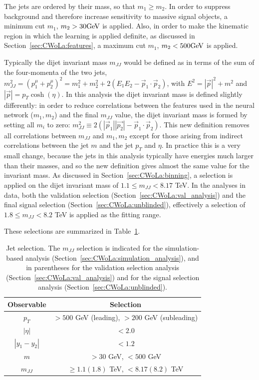 The jets are ordered by their mass, so that $m_1 \ge m_2$.
In order to suppress background and therefore increase sensitivity to massive signal objects, a minimum cut $m_1$, $m_2 > 30 \mathrm{GeV}$ is applied.
Also, in order to make the kinematic region in which the learning is applied definite, as discussed in Section~\ref{sec:CWoLa:features}, a maximum cut $m_1$, $m_2 < 500 \mathrm{GeV}$ is applied.

Typically the dijet invariant mass $m_{JJ}$ would be defined as in terms of the sum of the four-momenta of the two jets, $m_{JJ}^2 = (p^\mu_1+p^\mu_2)^2 = m_1^2+m_2^2+2\left(E_1E_2-\vec{p}_1\cdot\vec{p}_2\right)$, with $E^2 = |\vec{p}|^2+m^2$ and $|\vec{p}| = p_T\cosh(\eta)$.
In this analysis the dijet invariant mass is defined slightly differently: in order to reduce correlations between the features used in the neural network ($m_1,m_2$) and the final $m_{JJ}$ value, the dijet invariant mass is formed by setting all $m_i$ to zero: $m_{JJ}^2 \equiv 2\left(|\vec{p}_1||\vec{p_2}|-\vec{p}_1\cdot\vec{p}_2\right)$.
This new definition removes all correlations between $m_{JJ}$ and $m_1,m_2$ except for those arising from indirect correlations between the jet $m$ and the jet $p_T$ and $\eta$.
In practice this is a very small change, because the jets in this analysis typically have energies much larger than their masses, and so the new definition gives almost the same value for the invariant mass.
As discussed in Section~\ref{sec:CWoLa:binning}, a selection is applied on the dijet invariant mass of $1.1 \le m_{JJ} < 8.17$ TeV.
In the analyses in data, both the validation selection (Section~\ref{sec:CWoLa:val_analysis}) and the final signal selection (Section~\ref{sec:CWoLa:unblinded}), effectively a selection of $1.8 \le m_{JJ} < 8.2$ TeV is applied as the fitting range.

These selections are summarized in Table~\ref{tab:event_selection}.
\begin{table}[htbp]
  \begin{center}
    \caption{Jet selection. The $m_{JJ}$ selection is indicated for the simulation-based analysis (Section~\ref{sec:CWoLa:simulation_analysis}), and in parentheses for the validation selection analysis (Section~\ref{sec:CWoLa:val_analysis}) and for the signal selection analysis (Section~\ref{sec:CWoLa:unblinded}).}
  \label{tab:event_selection}
    \begin{tabular}{c c}
      \hline
      Observable & Selection \\
      \hline
      $p_T$ & $>500$ GeV (leading), $>200$ GeV (subleading) \\
      $|\eta|$ & $<2.0$ \\
      $|y_1-y_2|$ & $<1.2$ \\
      $m$ & $> 30$ GeV, $<500$ GeV \\
      $m_{JJ}$ & $\ge 1.1 (1.8)$ TeV, $<8.17 (8.2)$ TeV \\
      \hline
    \end{tabular}
  \end{center}
\end{table}

